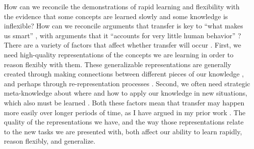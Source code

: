 How can we reconcile the demonstrations of rapid learning and flexibility with the evidence that some concepts are learned slowly and some knowledge is inflexible? How can we reconcile arguments that transfer is key to ``what makes us smart'' \citep{Gentner2003}, with arguments that it ``accounts for very little human behavior'' \citep{Detterman1993}? There are a variety of factors that affect whether transfer will occur \citep{Barnett2002, Lampinen2017a}. First, we need high-quality representations of the concepts we are learning in order to reason flexibly with them. These generalizable representations are generally created through making connections between different pieces of our knowledge \citep{Wilensky1991, Schwartz2015}, and perhaps through re-representation processes \citep[][see below]{Karmiloff-Smith1992}. Second, we often need strategic meta-knowledge about where and how to apply our knowledge in new situations, which also must be learned \citep{Weber2001}. Both these factors mean that transfer may happen more easily over longer periods of time, as I have argued in my prior work \citep{Lampinen2017a}. The quality of the representations we have, and the way those representations relate to the new tasks we are presented with, both affect our ability to learn rapidly, reason flexibly, and generalize. \par 

